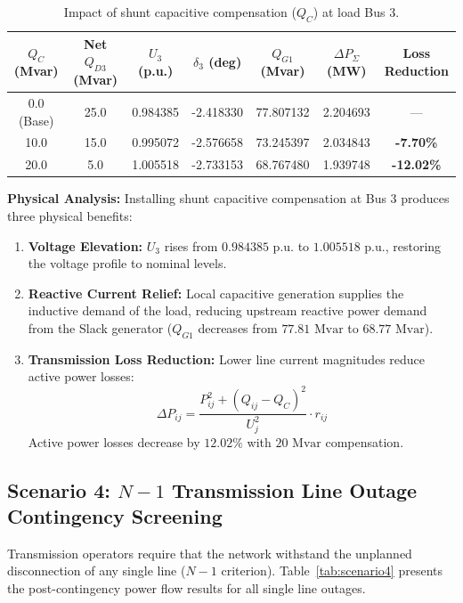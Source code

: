\documentclass[12pt,a4paper,oneside]{report}
\begin{document}
\begin{table}[H]
\centering
\caption{Impact of shunt capacitive compensation ($Q_C$) at load Bus 3.}
\label{tab:scenario3}
\begin{tabular}{ccccccc}
\toprule
\textbf{$Q_C$ (Mvar)} & \textbf{Net $Q_{D3}$ (Mvar)} & \textbf{$U_3$ (p.u.)} & \textbf{$\delta_3$ (deg)} & \textbf{$Q_{G1}$ (Mvar)} & \textbf{$\Delta P_{\Sigma}$ (MW)} & \textbf{Loss Reduction} \\
\midrule
0.0 (Base) & 25.0 & 0.984385 & -2.418330 & 77.807132 & 2.204693 & --- \\
10.0 & 15.0 & 0.995072 & -2.576658 & 73.245397 & 2.034843 & \textbf{-7.70\%} \\
20.0 & 5.0 & 1.005518 & -2.733153 & 68.767480 & 1.939748 & \textbf{-12.02\%} \\
\bottomrule
\end{tabular}
\end{table}

\textbf{Physical Analysis:}
Installing shunt capacitive compensation at Bus 3 produces three physical benefits:
\begin{enumerate}
    \item \textbf{Voltage Elevation:} $U_3$ rises from $0.984385\text{ p.u.}$ to $1.005518\text{ p.u.}$, restoring the voltage profile to nominal levels.
    \item \textbf{Reactive Current Relief:} Local capacitive generation supplies the inductive demand of the load, reducing upstream reactive power demand from the Slack generator ($Q_{G1}$ decreases from $77.81\text{ Mvar}$ to $68.77\text{ Mvar}$).
    \item \textbf{Transmission Loss Reduction:} Lower line current magnitudes reduce active power losses:
    \begin{equation}
    \Delta P_{ij} = \frac{P_{ij}^2 + (Q_{ij} - Q_C)^2}{U_j^2} \cdot r_{ij}
    \end{equation}
    Active power losses decrease by $12.02\%$ with $20\text{ Mvar}$ compensation.
\end{enumerate}

\subsection{Scenario 4: $N-1$ Transmission Line Outage Contingency Screening}
Transmission operators require that the network withstand the unplanned disconnection of any single line ($N-1$ criterion). Table~\ref{tab:scenario4} presents the post-contingency power flow results for all single line outages.
\end{document}
